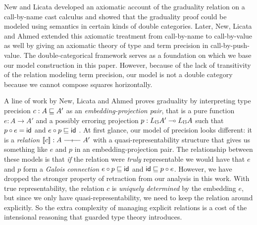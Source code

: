 New and Licata \cite{new-licata18} developed an axiomatic account of the
graduality relation on a call-by-name cast calculus and showed that the
graduality proof could be modeled using semantics in certain kinds of double
categories.
%
Later, New, Licata and Ahmed \cite{new-licata-ahmed2019} extended this axiomatic
treatment from call-by-name to call-by-value as well by giving an axiomatic
theory of type and term precision in call-by-push-value. The double-categorical
framework serves as a foundation on which we base our model construction in this
paper. However, because of the lack of transitivity of the relation modeling
term precision, our model is not a double category because we cannot compose
squares horizontally.




A line of work by New, Licata and Ahmed proves graduality by
interpreting type precision $c : A \sqsubseteq A'$ as an
\emph{embedding-projection pair}, that is a pure function $e : A \to
A'$ and a possibly erroring projection $p : L_\mho A' \multimap L_\mho A$
such that $p \circ e = \mathsf{id}$ and $e \circ p \sqsubseteq \mathsf{id}$
\cite{new-ahmed2018,new-licata18,new-licata-ahmed2019}. At first glance, our model
of precision looks different: it is a \emph{relation}
$\sem{c} : A \rel A'$ with a quasi-representability structure that
gives us something like $e$ and $p$ in an embedding-projection
pair. The relationship between these models is that \emph{if} the
relation were \emph{truly} representable we would have that $e$ and $p$ form a \emph{Galois
connection} $e \circ p \sqsubseteq \mathsf{id}$ and $\mathsf{id} \sqsubseteq p \circ
e$. However, we have dropped the stronger property of retraction from
our analysis in this work. With true representability, the relation
$c$ is \emph{uniquely determined} by the embedding $e$, but since we
only have quasi-representability, we need to keep the relation around
explicitly. So the extra complexity of managing explicit relations is
a cost of the intensional reasoning that guarded type theory
introduces.


